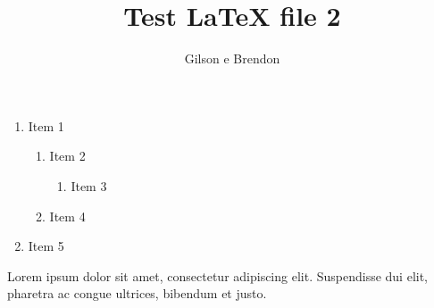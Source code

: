 \documentclass[12pt]{article}
\title{Test LaTeX file 2}
\author{Gilson e Brendon}
\begin{document}
\maketitle

\begin{enumerate}
\item Item 1
\begin{enumerate}
\item Item 2
\begin{enumerate}
\item Item 3
\end{enumerate}
\item Item 4
\end{enumerate}
\item Item 5
\end{enumerate}

Lorem ipsum dolor sit amet, consectetur adipiscing elit. Suspendisse dui elit, pharetra ac congue ultrices, bibendum et justo. 
\end{document}
